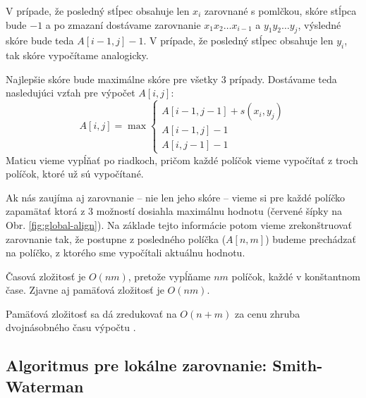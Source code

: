 V prípade, že posledný stĺpec obsahuje len $x_i$ zarovnané s pomlčkou, skóre stĺpca bude $-1$ a po zmazaní dostávame zarovnanie $x_1x_2\dots x_{i-1}$ a $y_1y_2\dots y_{j}$, výsledné skóre bude teda $A[i-1, j] -1$. V prípade, že posledný stĺpec obsahuje len $y_i$, tak skóre vypočítame analogicky.

Najlepšie skóre bude maximálne skóre pre všetky 3 prípady.
Dostávame teda nasledujúci vzťah pre výpočet $A[i,j]$:
$$A[i,j] = \max \left\{
\begin{array}{l}
A[i-1,j-1]+s(x_i, y_j)\\
A[i-1,j]-1\\
A[i,j-1]-1
\end{array} \right.$$
Maticu vieme vypĺňať po riadkoch, pričom každé políčok vieme vypočítať z troch políčok, ktoré už sú vypočítané.

Ak nás zaujíma aj zarovnanie -- nie len jeho skóre -- vieme si pre každé políčko zapamätať ktorá z 3 možností dosiahla maximálnu hodnotu
(červené šípky na Obr. \ref{fig:global-align}). Na základe tejto informácie potom vieme zrekonštruovať zarovnanie tak, že postupne z posledného políčka ($A[n,m]$) budeme prechádzať na políčko, z ktorého sme vypočítali aktuálnu hodnotu.

Časová zložitosť je $O(nm)$, pretože vypĺňame $nm$ políčok, každé v konštantnom čase. Zjavne aj pamäťová zložitosť je $O(nm)$.

Pamäťová zložitosť sa dá zredukovať na $O(n+m)$ za cenu zhruba dvojnásobného času výpočtu \cite{hirschberg}.

\subsection{Algoritmus pre lokálne zarovnanie: Smith-Waterman}


